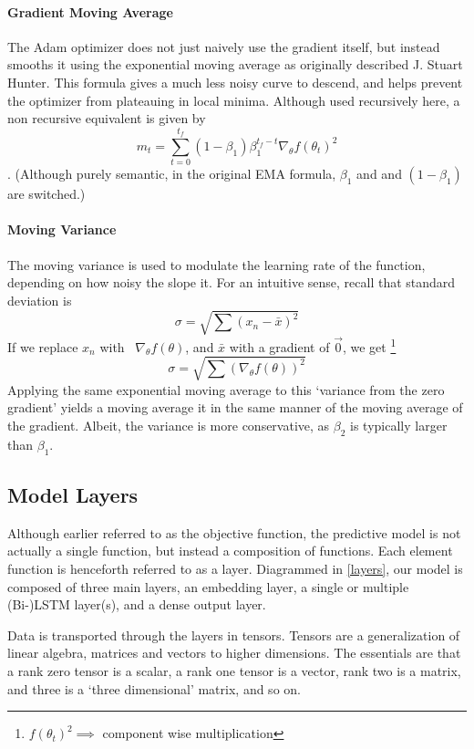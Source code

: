 \documentclass[titlepage,letterpaper]{article}
\begin{document}
\paragraph{Gradient Moving Average}
The Adam optimizer does not just naively use the gradient itself, but instead smooths it using the exponential moving average as originally described J. Stuart Hunter.\cite{EMA} This formula gives a much less noisy curve to descend, and helps prevent the optimizer from plateauing in local minima. Although used recursively here, a non recursive equivalent is given by
\[m_t = \sum_{t=0}^{t_f} \left(1-\beta_1\right) \beta_1^{t_f-t}\nabla_\theta f\left(\theta_{t}\right)^2\].
(Although purely semantic, in the original EMA formula, \(\beta_1\) and and \(\left(1-\beta_1\right)\) are switched.)
\paragraph{Moving Variance}
The moving variance is used to modulate the learning rate of the function, depending on how noisy the slope it. For an intuitive sense, 
recall that standard deviation is
\[\sigma = \sqrt{\sum \left(x_n - \bar{x}\right)^2}\]
If we replace \(x_n\) with \ \(\nabla_\theta f(\theta)\), and \(\bar{x}\) with a gradient of \(\vec{0}\), we get \footnote{\(f\left(\theta_{t}\right)^2 \implies \) component wise multiplication}
\[\sigma = \sqrt{\sum \left(\nabla_\theta f(\theta)\right)^2}\]
Applying the same exponential moving average to this `variance from the zero gradient' yields a moving average it in the same manner of the moving average of the gradient. Albeit, the variance is more conservative, as \(\beta_2\) is typically larger than \(\beta_1\)\cite{adam}.

\subsection{Model Layers}

Although earlier referred to as the objective function, the predictive model is not actually a single function, but instead a composition of functions. Each element function is henceforth referred to as a layer. Diagrammed in \cref{layers}, our model is composed of three main layers, an embedding layer, a single or multiple (Bi-)LSTM layer(s), and a dense output layer.

Data is transported through the layers in tensors\cite{tensorflow}. Tensors are a generalization of linear algebra, matrices and vectors to higher dimensions. The essentials are that a rank zero tensor is a scalar, a rank one tensor is a vector, rank two is a matrix, and three is a `three dimensional' matrix, and so on. \cite{tensors}
\end{document}
